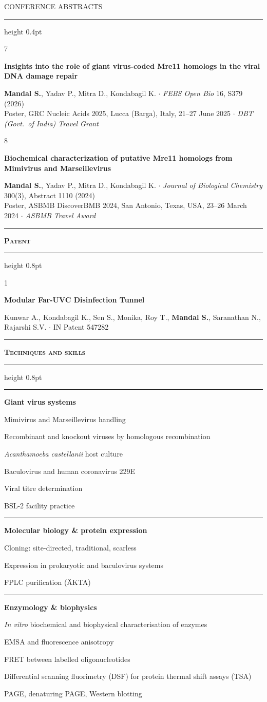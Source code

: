 \documentclass[11pt]{article}
\newcommand{\webpage}[2]{}   %
\newcommand{\sectionhead}[2]{%
  \needspace{4\baselineskip}%
  \vspace{1.25em}%
  \noindent
  {\color{accent}\rule[-0.22em]{3.2pt}{1.05em}}\hspace{0.55em}%
  {\fontsize{13}{15}\selectfont\bfseries\scshape\color{accent}#1}%
  \par\vspace{0.38em}
  {\color{accent}\hrule height 0.8pt}%
  \vspace{0.95em}%
  \ifx\relax#2\relax\else
    {\fontsize{11}{13}\selectfont\bfseries #2}\par
    \vspace{0.55em}%
  \fi
}
\newcommand{\pub}[3]{%
  \needspace{3\baselineskip}%
  \begingroup
  \setlength{\parskip}{0pt}%
  \noindent
  \begin{minipage}[t]{0.035\linewidth}
    {\ttfamily\scriptsize\textcolor{inkfaint}{#1}}
  \end{minipage}%
  \hspace{0.015\linewidth}%
  \begin{minipage}[t]{0.95\linewidth}
    \textbf{#2}\par
    \vspace{0.14em}
    {\small\textcolor{inksoft}{#3}}
  \end{minipage}
  \par
  \endgroup
  \vspace{0.7em}
}
\newcommand{\pubgroup}[1]{%
  \needspace{5\baselineskip}%
  \vspace{0.3em}
  {\ttfamily\scriptsize\textcolor{inkfaint}{\MakeUppercase{#1}}}\par
  \vspace{0.25em}
  {\color{rule}\hrule height 0.4pt}
  \vspace{0.8em}
}
\newif\ifskillfirst
\newcommand{\skillsep}{\ \textcolor{inkfaint}{$\cdot$}\ }
\newenvironment{skillgroup}[1]{%
  \needspace{3\baselineskip}%
  \par\noindent
  \begingroup
  \setlength{\parskip}{0pt}%
  {\color{accent}\rule[0.06em]{0.42em}{0.42em}}\hspace{0.45em}%
  \textbf{\small #1}\par
  \vspace{0.2em}
  \small
  \skillfirsttrue
}{%
  \par\endgroup
  \vspace{0.75em}
}
\newcommand{\skill}[1]{%
  \ifskillfirst\skillfirstfalse\else\skillsep\fi
  #1%
}
\newcommand{\venue}[1]{\textit{#1}}
\newcommand{\me}{\textbf{\textcolor{ink}{Mandal S.}}}
\begin{document}
\pubgroup{Conference abstracts}

\pub{7}{Insights into the role of giant virus-coded Mre11 homologs in the
  viral DNA damage repair}{%
  \me, Yadav P., Mitra D., Kondabagil K. $\cdot$ \venue{FEBS Open Bio}
  16, S379 (2026)\\
  Poster, GRC Nucleic Acids 2025, Lucca (Barga), Italy, 21--27 June 2025 $\cdot$
  \textit{DBT (Govt.\ of India) Travel Grant}}

\pub{8}{Biochemical characterization of putative Mre11 homologs from
  Mimivirus and Marseillevirus}{%
  \me, Yadav P., Mitra D., Kondabagil K. $\cdot$
  \venue{Journal of Biological Chemistry} 300(3), Abstract 1110 (2024)\\
  Poster, ASBMB DiscoverBMB 2024, San Antonio, Texas, USA, 23--26 March 2024 $\cdot$
  \textit{ASBMB Travel Award}}

\sectionhead{Patent}{}

\pub{1}{Modular Far-UVC Disinfection Tunnel}{%
  Kunwar A., Kondabagil K., Sen S., Monika, Roy T., \me,
  Saranathan N., Rajarshi S.V. $\cdot$ IN Patent 547282}

\webpage{techniques}{Techniques}
\sectionhead{Techniques and skills}{}

\begin{skillgroup}{Giant virus systems}
  \skill{Mimivirus and Marseillevirus handling}
  \skill{Recombinant and knockout viruses by
         homologous recombination}
  \skill{\textit{Acanthamoeba castellanii} host culture}
  \skill{Baculovirus and human coronavirus 229E}
  \skill{Viral titre determination}
  \skill{BSL-2 facility practice}
\end{skillgroup}

\begin{skillgroup}{Molecular biology \& protein expression}
  \skill{Cloning: site-directed, traditional, scarless}
  \skill{Expression in prokaryotic and baculovirus systems}
  \skill{FPLC purification (ÄKTA)}
\end{skillgroup}

\begin{skillgroup}{Enzymology \& biophysics}
  \skill{\textit{In vitro} biochemical and biophysical
         characterisation of enzymes}
  \skill{EMSA and fluorescence anisotropy}
  \skill{FRET between labelled oligonucleotides}
  \skill{Differential scanning fluorimetry (DSF) for
         protein thermal shift assays (TSA)}
  \skill{PAGE, denaturing PAGE, Western blotting}
\end{skillgroup}
\end{document}
